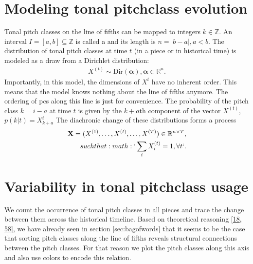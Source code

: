 \documentclass[letterpaper,10pt,english]{sphinxmanual}
\begin{document}
\section{Modeling tonal pitch\sphinxhyphen{}class evolution}
\label{\detokenize{history:modeling-tonal-pitch-class-evolution}}
\sphinxAtStartPar
Tonal pitch classes on the line of fifths can be mapped to integers
\(k \in \mathbb Z\). An interval \(I=[a,b]\subseteq\mathbb Z\)
is called a  and its length is
\(n=|b-a|, a<b\). The distribution of tonal pitch classes at time
\(t\) (in a piece or in historical time) is modeled as a draw from a
Dirichlet distribution:
\begin{equation*}
\begin{split}X^{(t)}\sim \mathrm{Dir}(\mathbf{\alpha}), \mathbf{\alpha}\in\mathbb R^n.\end{split}
\end{equation*}
\sphinxAtStartPar
Importantly, in this model, the dimensions of \(X^{t}\) have no
inherent order. This means that the model knows nothing about the line
of fifths anymore. The ordering of pcs along this line is just for
convenience. The probability of the pitch class \(k = i-a\) at time
\(t\) is given by the \(k+a\)th component of the vector
\(X^{(t)}\), \(p(k | t)=X_{k+a}^{t}\) The diachronic change of
these distributions forms a process
\begin{align*}\!\begin{aligned}
\mathbf{X}=(X^{(1)},\dots,X^{(t)},\dots,X^{(T)})\in \mathbb R^{n\times T},\\
such that :math:`\sum_i X_i^{(t)}=1,\forall t`.\\
\end{aligned}\end{align*}

\section{Variability in tonal pitch\sphinxhyphen{}class usage}
\label{\detokenize{history:variability-in-tonal-pitch-class-usage}}
\sphinxAtStartPar
We count the occurrence of tonal pitch classes in all pieces and trace
the change between them across the historical timeline. Based on
theoretical reasoning {[}\hyperlink{cite.8_bibliography:id63}{18}, \hyperlink{cite.8_bibliography:id40}{58}{]},
we have already seen in section {[}sec:bagofwords{]} that it seems to be the
case that sorting pitch classes along the line of fifths reveals
structural connections between the pitch classes. For that reason we
plot the pitch classes along this axis and also use colors to encode
this relation.
\end{document}
